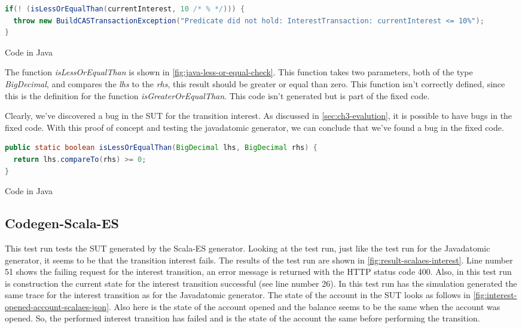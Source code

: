 \begin{sourcecode}[h!]
\begin{lstlisting}[language=Java]
if(! (isLessOrEqualThan(currentInterest, 10 /* % */))) {
  throw new BuildCASTransactionException("Predicate did not hold: InterestTransaction: currentInterest <= 10%");
}
\end{lstlisting}
\caption{Code in Java}
\label{fig:java-gen-interest-pre}
\end{sourcecode}

The function \textit{isLessOrEqualThan} is shown in
\autoref{fig:java-less-or-equal-check}. This function takes two parameters, both
of the type \textit{BigDecimal}, and compares the \textit{lhs} to the
\textit{rhs}, this result should be greater or equal than zero. This function
isn't correctly defined, since this is the definition for the function
\textit{isGreaterOrEqualThan}. This code isn't generated but is part of the
fixed code.

Clearly, we've discovered a bug in the SUT for the transition
interest. As discussed in \autoref{sec:ch3-evalution}, it is possible to have
bugs in the fixed code. With this proof of concept and testing the javadatomic
generator, we can conclude that we've found a bug in the fixed code.

\begin{sourcecode}[h!]
\begin{lstlisting}[language=Java]
public static boolean isLessOrEqualThan(BigDecimal lhs, BigDecimal rhs) {
  return lhs.compareTo(rhs) >= 0;
}
\end{lstlisting}
\caption{Code in Java}
\label{fig:java-less-or-equal-check}
\end{sourcecode}

\subsection{Codegen-Scala-ES}
\label{sec:bug-interest-scalaes}

This test run tests the SUT generated by the Scala-ES generator. Looking at the
test run, just like the test run for the Javadatomic generator, it seems to be
that the transition interest fails. The results of the test run are shown in
\autoref{fig:result-scalaes-interest}. Line number 51 shows the failing request
for the interest transition, an error message is returned with the HTTP status
code 400. Also, in this test run is construction the current state for the
interest transition successful (see line number 26). In this test run has the
simulation generated the same trace for the interest transition as for the
Javadatomic generator. The state of the account in the SUT looks as follows in
\autoref{fig:interest-opened-account-scalaes-json}. Also here is the state of the
account opened and the balance seems to be the same when the account was opened.
So, the performed interest transition has failed and is the state of the account
the same before performing the transition.

